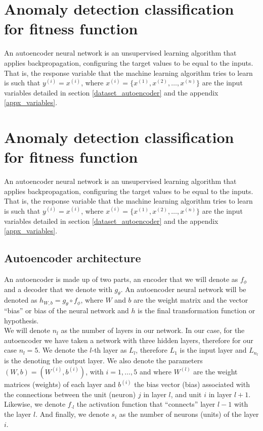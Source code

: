 \documentclass{iosart2c}
\begin{document}
\section{Anomaly detection classification for fitness function}\label{autoencoder_section}

An autoencoder neural network is an unsupervised learning algorithm that applies backpropagation, configuring the target values to be equal to the inputs. That is, the response variable that the machine learning algorithm tries to learn is such that $y^{(i)} = x^{(i)} $, where $x^{(i)} = \{x^{(1)}, x^{(2)}, \ldots, x^{(n)} \} $ are the input variables detailed in section \ref{dataset_autoencoder} and the appendix \ref{appx_variables}.\\

\section{Anomaly detection classification for fitness function}\label{autoencoder_section}

An autoencoder neural network is an unsupervised learning algorithm that applies backpropagation, configuring the target values to be equal to the inputs. That is, the response variable that the machine learning algorithm tries to learn is such that $y^{(i)} = x^{(i)} $, where $x^{(i)} = \{x^{(1)}, x^{(2)}, \ldots, x^{(n)} \} $ are the input variables detailed in section \ref{dataset_autoencoder} and the appendix \ref{appx_variables}.\\

\subsection{Autoencoder architecture}\label{autoencoder_architecture}

An autoencoder is made up of two parts, an encoder that we will denote as $ f_{\phi} $ and a decoder that we denote with $ g_{\theta} $. An autoencoder neural network will be denoted as $ h_{W, b} = g_\theta \circ f_\phi$, where $W$ and $b$ are the weight matrix and the vector ``bias'' or bias of the neural network and $h$ is the final transformation function or hypothesis. \\

We will denote $n_l$ as the number of layers in our network. In our case, for the autoencoder we have taken a network with three hidden layers, therefore for our case $n_l=5$. We denote the $l$-th layer as $L_l$, therefore $L_1$ is the input layer and $L_{n_l}$ is the denoting the output layer. We also denote the parameters $(W,b)=(W^{(i)},b^{(i)})$, with $i=1,\ldots,5$ and where $W^{(l)}$ are the weight matrices (weights) of each layer and $b^{(i)}$ the bias vector (bias) associated with the connections between the unit (neuron) $j$ in layer $l$, and unit $i$ in layer $l+1$. Likewise, we denote $f_{\cdot l}$ the activation function that ``connects'' layer $l-1$ with the layer $l$. And finally, we denote $s_i$ as the number of neurons (units) of the layer $i$. \\
\end{document}

